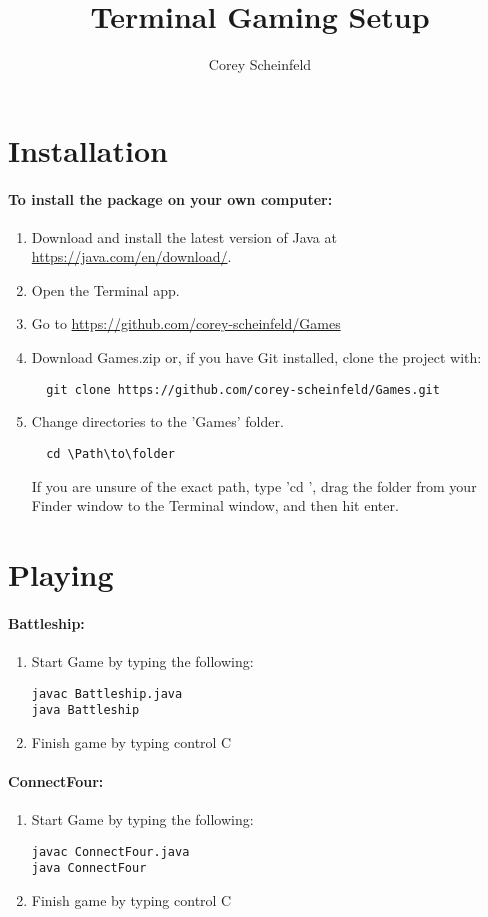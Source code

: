 \documentclass{article}
\title{Terminal Gaming Setup}
\author{Corey Scheinfeld}
\begin{document}
	\maketitle
	\newpage

	\section{Installation}
		\paragraph{To install the package on your own computer:}
			\begin{enumerate}
				\item Download and install the latest version of Java at \url{https://java.com/en/download/}.
				\item Open the Terminal app.
				\item Go to \url{https://github.com/corey-scheinfeld/Games}
				\item Download Games.zip or, if you have Git installed, clone the project with:
					\begin{lstlisting}
  git clone https://github.com/corey-scheinfeld/Games.git
					\end{lstlisting}
				\item Change directories to the 'Games' folder. 
					\begin{lstlisting}
  cd \Path\to\folder
					\end{lstlisting}
					If you are unsure of the exact path, type 'cd ', drag the folder from your Finder window to the Terminal window, and then hit enter.
  		\end{enumerate}

\section{Playing}
				\paragraph{Battleship:}
					\begin{enumerate}
								\item Start Game by typing the following:
									\begin{lstlisting}
javac Battleship.java
java Battleship
									\end{lstlisting}
								\item Finish game by typing control C

					\end{enumerate}
				\paragraph{ConnectFour:}
					\begin{enumerate}
								\item Start Game by typing the following:
									\begin{lstlisting}
javac ConnectFour.java
java ConnectFour
									\end{lstlisting}
								\item Finish game by typing control C

					\end{enumerate}
\end{document}
